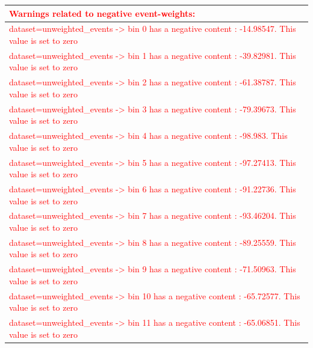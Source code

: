 \documentclass[a4paper, 10pt]{article}
\begin{document}
\begin{table}[H]
  \begin{center}
    \begin{tabular}{|m{140.0mm}|}
      \hline
      {\cellcolor{white}\textcolor{red}{Warnings related to negative event-weights:}}\\
      \hline
      {\cellcolor{white}\textcolor{red}{dataset=unweighted\_events -> bin 0 has a negative content : -14.98547. This value is set to zero}}\\
      \hline
      {\cellcolor{white}\textcolor{red}{dataset=unweighted\_events -> bin 1 has a negative content : -39.82981. This value is set to zero}}\\
      \hline
      {\cellcolor{white}\textcolor{red}{dataset=unweighted\_events -> bin 2 has a negative content : -61.38787. This value is set to zero}}\\
      \hline
      {\cellcolor{white}\textcolor{red}{dataset=unweighted\_events -> bin 3 has a negative content : -79.39673. This value is set to zero}}\\
      \hline
      {\cellcolor{white}\textcolor{red}{dataset=unweighted\_events -> bin 4 has a negative content : -98.983. This value is set to zero}}\\
      \hline
      {\cellcolor{white}\textcolor{red}{dataset=unweighted\_events -> bin 5 has a negative content : -97.27413. This value is set to zero}}\\
      \hline
      {\cellcolor{white}\textcolor{red}{dataset=unweighted\_events -> bin 6 has a negative content : -91.22736. This value is set to zero}}\\
      \hline
      {\cellcolor{white}\textcolor{red}{dataset=unweighted\_events -> bin 7 has a negative content : -93.46204. This value is set to zero}}\\
      \hline
      {\cellcolor{white}\textcolor{red}{dataset=unweighted\_events -> bin 8 has a negative content : -89.25559. This value is set to zero}}\\
      \hline
      {\cellcolor{white}\textcolor{red}{dataset=unweighted\_events -> bin 9 has a negative content : -71.50963. This value is set to zero}}\\
      \hline
      {\cellcolor{white}\textcolor{red}{dataset=unweighted\_events -> bin 10 has a negative content : -65.72577. This value is set to zero}}\\
      \hline
      {\cellcolor{white}\textcolor{red}{dataset=unweighted\_events -> bin 11 has a negative content : -65.06851. This value is set to zero}}\\

\end{tabular}
\end{center}
\end{table}
\end{document}

